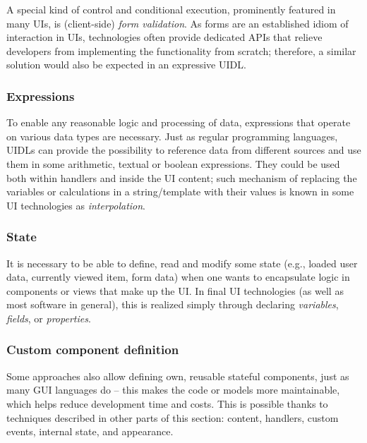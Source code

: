 A special kind of control and conditional execution, prominently featured in many UIs, is (client-side) \emph{form validation}.
As forms are an established idiom of interaction in UIs, technologies often provide dedicated APIs that relieve developers from implementing the functionality from scratch;
therefore, a similar solution would also be expected in an expressive UIDL\@.

\subsubsection{Expressions}
To enable any reasonable logic and processing of data, expressions that operate on various data types are necessary.
Just as regular programming languages, UIDLs can provide the possibility to reference data from different sources and use them in some arithmetic, textual or boolean expressions.
They could be used both within handlers and inside the UI content;
such mechanism of replacing the variables or calculations in a string/template with their values is known in some UI technologies as \emph{interpolation}.

\subsubsection{State}
It is necessary to be able to define, read and modify some state (e.g., loaded user data, currently viewed item, form data) when one wants to encapsulate logic in components or views that make up the UI\@.
In final UI technologies (as well as most software in general), this is realized simply through declaring \emph{variables}, \emph{fields}, or \emph{properties}.

\subsubsection{Custom component definition}
Some approaches also allow defining own, reusable stateful components, just as many GUI languages do -- this makes the code or models more maintainable, which helps reduce development time and costs.
This is possible thanks to techniques described in other parts of this section: content, handlers, custom events, internal state, and appearance.

